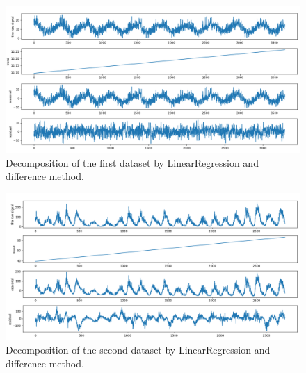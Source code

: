 \documentclass[12pt]{article}
\begin{document}
\begin{enumerate}
\begin{figure}[H]
    \centering
    \begin{minipage}[b]{1\textwidth}
        \includegraphics[width=\textwidth]{figures/Ass1/Ass1_D1_LinearRegression_diff.png}
    \end{minipage}
    \caption{Decomposition of the first dataset by LinearRegression and difference method.}
    \label{fig:Ass1_D1_LinearRegression_diff}
\end{figure}

\begin{figure}[H]
    \centering
    \begin{minipage}[b]{1\textwidth}
        \includegraphics[width=\textwidth]{figures/Ass1/Ass1_D2_LinearRegression_diff.png}
    \end{minipage}
    \caption{Decomposition of the second dataset by LinearRegression and difference method.}
    \label{fig:Ass1_D2_LinearRegression_diff}
\end{figure}


\end{enumerate}
\end{document}
